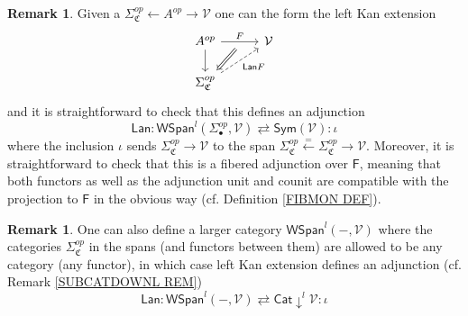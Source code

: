 \documentclass[a4paper,10pt
,draft
]{article}%
\numberwithin{equation}{section}
\numberwithin{figure}{section}
\theoremstyle{definition} %
\newtheorem{remark}[equation]{Remark}%
\newcommand{\1}{\ensuremath{\mathbbm 1}}%
\begin{document}
\begin{remark}\label{LANADJ REM}
Given a $\Sigma^{op}_{\mathfrak{C}} \leftarrow A^{op} \rightarrow \mathcal{V}$
one can the form the left Kan extension
\[
\begin{tikzcd}[column sep = 30pt]
	A^{op}
		\ar{r}[name=U,swap]{}{F} \ar{d} &
	\mathcal{V}	
\\
	|[alias=V]|
	\Sigma_{\mathfrak{C}}^{op} 
		\ar[dashed]{ru}[swap]{\mathsf{Lan} F}
\arrow[Leftarrow, from=V, to=U,shorten >=0.05cm,shorten <=0.05cm]
\end{tikzcd}
\]
and it is straightforward to check that this defines an adjunction
\[
	\mathsf{Lan} \colon
	\mathsf{WSpan}^l(\Sigma_{\bullet}^{op},\mathcal{V}) 
\rightleftarrows
	\mathsf{Sym}(\mathcal{V})
	\colon \iota
\]
where the inclusion $\iota$ sends $\Sigma^{op}_{\mathfrak{C}} \to \mathcal{V}$ 
to the span
$\Sigma^{op}_{\mathfrak{C}} \xleftarrow{=} \Sigma^{op}_{\mathfrak{C}} \to \mathcal{V}$.
Moreover, it is straightforward to check that this is a fibered adjunction over $\mathsf{F}$, meaning that both functors as well as the adjunction unit and counit are compatible with the projection to $\mathsf{F}$ in the obvious way (cf. Definition \ref{FIBMON DEF}).
\end{remark}



\begin{remark}
One can also define a larger category 
$\mathsf{WSpan}^l( - ,\mathcal{V})$
where the categories $\Sigma_{\mathfrak{C}}^{op}$ in the spans (and functors between them) are allowed to be any category (any functor),
in which case left Kan extension defines an adjunction (cf. Remark \ref{SUBCATDOWNL REM})
\[
	\mathsf{Lan} \colon
	\mathsf{WSpan}^l( - ,\mathcal{V}) 
\rightleftarrows
	\mathsf{Cat} \downarrow ^l \mathcal{V}
	\colon \iota
\]
\end{remark}
\end{document}
